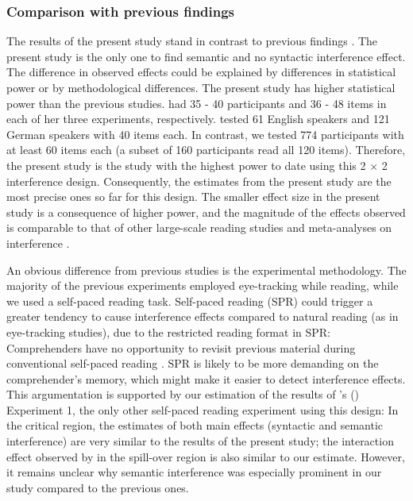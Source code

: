 \documentclass[a4paper, man, floatsintext]{apa7}
\begin{document}
\subsubsection{Comparison with previous findings}
The results of the present study stand in contrast to previous findings \citep{vandyke07, mertzen}. The present study is the only one to find semantic and no syntactic interference effect. The difference in observed effects could be explained by differences in statistical power or by methodological differences. The present study has higher statistical power than the previous studies. \citet{vandyke07} had 35 - 40 participants and 36 - 48 items in each of her three experiments, respectively. \textcite{mertzen} tested 61 English speakers and 121 German speakers with 40 items each. In contrast, we tested 774 participants with at least 60 items each (a subset of 160 participants read all 120 items). Therefore, the present study is the study with the highest power to date using this 2 $\times$ 2 interference design. Consequently, the estimates from the present study are the most precise ones so far for this design. The smaller effect size in the present study is a consequence of higher power, and the magnitude of the effects observed is comparable to that of other large-scale reading studies \citep{nicenboim} and meta-analyses on interference \citep{jaeger_etal_2017}.

An obvious difference from previous studies is the experimental methodology. The majority of the previous experiments employed eye-tracking while reading, while we used a self-paced reading task. Self-paced reading (SPR) could trigger a greater tendency to cause interference effects compared to natural reading (as in eye-tracking studies), due to the restricted reading format in SPR: Comprehenders have no opportunity to revisit previous material during conventional self-paced reading \citep[but see][]{BSPR}. SPR is likely to be more demanding on the comprehender's memory, which might make it easier to detect interference effects. This argumentation is supported by our estimation of the results of \citeauthor{vandyke07}'s (\citeyear{vandyke07}) Experiment 1, the only other self-paced reading experiment using this design: %
In the critical region, the estimates of both main effects (syntactic and semantic interference) are very similar to the results of the present study; the interaction effect observed by \citeauthor{vandyke07} in the spill-over region is also similar to our estimate. However, it remains unclear why semantic interference was especially prominent in our study compared to the previous ones.
\end{document}
